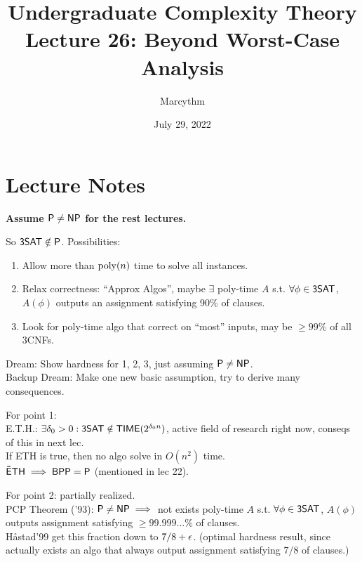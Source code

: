 \documentclass{article}
\title{Undergraduate Complexity Theory \\ Lecture 26: Beyond Worst-Case Analysis}
\author{Marcythm}
\date{July 29, 2022}
\begin{document}
\maketitle{}

\section{Lecture Notes}

{\bf Assume \(\text{\sf P} \neq \text{\sf NP}\) for the rest lectures.}

So \(\text{\sf 3SAT} \notin \text{\sf P}\). Possibilities:
\begin{enumerate}
  \item Allow more than \(\operatorname{poly}(n)\) time to solve all instances.
  \item Relax correctness: ``Approx Algos'', maybe \(\exists\) poly-time \(A\) s.t. \(\forall \phi \in \text{\sf 3SAT}\), \(A(\phi)\) outputs an assignment satisfying 90\% of clauses.
  \item Look for poly-time algo that correct on ``most'' inputs, may be \(\geq 99\%\) of all 3CNFs.
\end{enumerate}
Dream: Show hardness for 1, 2, 3, just assuming \(\text{\sf P} \neq \text{\sf NP}\). \\
Backup Dream: Make one new basic assumption, try to derive many consequences.

\begin{mdframed}
  For point 1: \\
  E.T.H.: \(\exists \delta_0 > 0: \text{\sf 3SAT} \notin \text{\sf TIME}(2^{\delta_0 n})\), active field of research right now, conseqs of this in next lec. \\
  If ETH is true, then no algo solve  in \(O(n^2)\) time. \\
  \(\text{\sf \~ETH} \implies \text{\sf BPP} = \text{\sf P}\) (mentioned in lec 22).
\end{mdframed}

\begin{mdframed}
  For point 2: partially realized. \\
  PCP Theorem ('93): \(\text{\sf P} \neq \text{\sf NP} \implies \) not exists poly-time \(A\) s.t. \(\forall \phi \in \text{\sf 3SAT}\), \(A(\phi)\) outputs assignment satisfying \(\geq 99.999\ldots\%\) of clauses. \\
  Håstad'99 get this fraction down to \(7/8 + \epsilon\). (optimal hardness result, since actually exists an algo that always output assignment satisfying \(7/8\) of clauses.)
\end{mdframed}

\end{document}
